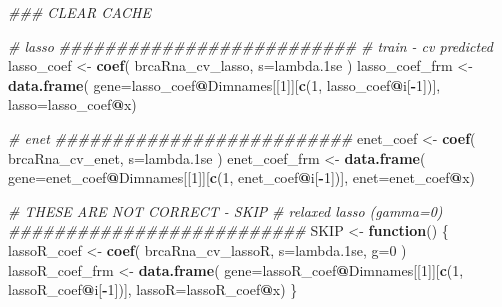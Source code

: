 \documentclass[
]{book}
\newenvironment{Shaded}{\begin{snugshade}}{\end{snugshade}}
\newcommand{\CommentTok}[1]{\textcolor[rgb]{0.56,0.35,0.01}{\textit{#1}}}
\newcommand{\ControlFlowTok}[1]{\textcolor[rgb]{0.13,0.29,0.53}{\textbf{#1}}}
\newcommand{\DataTypeTok}[1]{\textcolor[rgb]{0.13,0.29,0.53}{#1}}
\newcommand{\DecValTok}[1]{\textcolor[rgb]{0.00,0.00,0.81}{#1}}
\newcommand{\KeywordTok}[1]{\textcolor[rgb]{0.13,0.29,0.53}{\textbf{#1}}}
\newcommand{\NormalTok}[1]{#1}
\newcommand{\OperatorTok}[1]{\textcolor[rgb]{0.81,0.36,0.00}{\textbf{#1}}}
\newcommand{\StringTok}[1]{\textcolor[rgb]{0.31,0.60,0.02}{#1}}
\begin{document}
\begin{Shaded}
\begin{Highlighting}[]
\CommentTok{\#\#\# CLEAR CACHE}

\CommentTok{\# lasso }
\CommentTok{\#\#\#\#\#\#\#\#\#\#\#\#\#\#\#\#\#\#\#\#\#\#\#\#\#\#}
\CommentTok{\# train {-} cv predicted}
\NormalTok{lasso\_coef <{-}}\StringTok{ }\KeywordTok{coef}\NormalTok{(}
\NormalTok{ brcaRna\_cv\_lasso,}
 \DataTypeTok{s=}\StringTok{\textquotesingle{}lambda.1se\textquotesingle{}}
\NormalTok{)}
\NormalTok{lasso\_coef\_frm <{-}}\StringTok{ }\KeywordTok{data.frame}\NormalTok{(}
 \DataTypeTok{gene=}\NormalTok{lasso\_coef}\OperatorTok{@}\NormalTok{Dimnames[[}\DecValTok{1}\NormalTok{]][}\KeywordTok{c}\NormalTok{(}\DecValTok{1}\NormalTok{, lasso\_coef}\OperatorTok{@}\NormalTok{i[}\OperatorTok{{-}}\DecValTok{1}\NormalTok{])],}
 \DataTypeTok{lasso=}\NormalTok{lasso\_coef}\OperatorTok{@}\NormalTok{x)}


\CommentTok{\# enet}
\CommentTok{\#\#\#\#\#\#\#\#\#\#\#\#\#\#\#\#\#\#\#\#\#\#\#\#\#\#}
\NormalTok{enet\_coef <{-}}\StringTok{ }\KeywordTok{coef}\NormalTok{(}
\NormalTok{ brcaRna\_cv\_enet,}
 \DataTypeTok{s=}\StringTok{\textquotesingle{}lambda.1se\textquotesingle{}}
\NormalTok{)}
\NormalTok{enet\_coef\_frm <{-}}\StringTok{ }\KeywordTok{data.frame}\NormalTok{(}
 \DataTypeTok{gene=}\NormalTok{enet\_coef}\OperatorTok{@}\NormalTok{Dimnames[[}\DecValTok{1}\NormalTok{]][}\KeywordTok{c}\NormalTok{(}\DecValTok{1}\NormalTok{, enet\_coef}\OperatorTok{@}\NormalTok{i[}\OperatorTok{{-}}\DecValTok{1}\NormalTok{])],}
 \DataTypeTok{enet=}\NormalTok{enet\_coef}\OperatorTok{@}\NormalTok{x)}

\CommentTok{\# THESE ARE NOT CORRECT {-} SKIP}
\CommentTok{\# relaxed lasso (gamma=0)}
\CommentTok{\#\#\#\#\#\#\#\#\#\#\#\#\#\#\#\#\#\#\#\#\#\#\#\#\#\#}
\NormalTok{SKIP <{-}}\StringTok{ }\ControlFlowTok{function}\NormalTok{() \{}
\NormalTok{lassoR\_coef <{-}}\StringTok{ }\KeywordTok{coef}\NormalTok{(}
\NormalTok{ brcaRna\_cv\_lassoR,}
 \DataTypeTok{s=}\StringTok{\textquotesingle{}lambda.1se\textquotesingle{}}\NormalTok{,}
 \DataTypeTok{g=}\DecValTok{0}
\NormalTok{)}
\NormalTok{lassoR\_coef\_frm <{-}}\StringTok{ }\KeywordTok{data.frame}\NormalTok{(}
 \DataTypeTok{gene=}\NormalTok{lassoR\_coef}\OperatorTok{@}\NormalTok{Dimnames[[}\DecValTok{1}\NormalTok{]][}\KeywordTok{c}\NormalTok{(}\DecValTok{1}\NormalTok{, lassoR\_coef}\OperatorTok{@}\NormalTok{i[}\OperatorTok{{-}}\DecValTok{1}\NormalTok{])],}
 \DataTypeTok{lassoR=}\NormalTok{lassoR\_coef}\OperatorTok{@}\NormalTok{x)}
\NormalTok{\}}


\end{Highlighting}
\end{Shaded}
\end{document}
